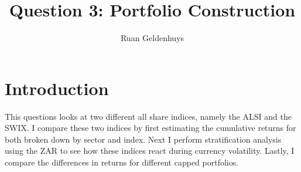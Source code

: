 \documentclass[11pt,preprint, authoryear]{elsarticle}
\numberwithin{equation}{section}
\numberwithin{figure}{section}
\numberwithin{table}{section}
\begin{document}
\begin{frontmatter}  %

\title{Question 3: Portfolio Construction}





\author[Add1]{Ruan Geldenhuys}





\address[Add1]{Stellenbosch University, Stellenbosch, South Africa}



\vspace{1cm}





\vspace{0.5cm}

\end{frontmatter}

\setcounter{footnote}{0}



\pagestyle{fancy}
\chead{}
\rhead{}
\lfoot{}
\rfoot{}
\lhead{}
\cfoot{}


\headsep 35pt %




\hypertarget{introduction}{%
\section{Introduction}\label{introduction}}

This questions looks at two different all share indices, namely the ALSI
and the SWIX. I compare these two indices by first estimating the
cumulative returns for both broken down by sector and index. Next I
perform stratification analysis using the ZAR to see how these indices
react during currency volatility. Lastly, I compare the differences in
returns for different capped portfolios.
\end{document}
